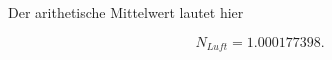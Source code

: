Der arithetische Mittelwert lautet hier

\begin{equation}
  N_{Luft} = 1.000177398.
\end{equation}

